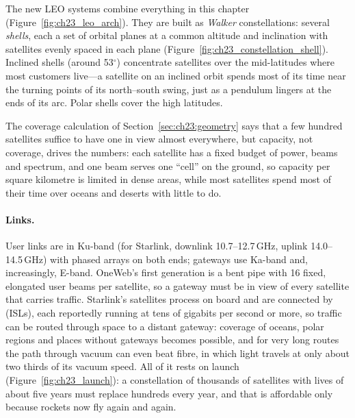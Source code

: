The new LEO systems combine everything in this chapter (Figure~\ref{fig:ch23_leo_arch}). They are
built as \emph{Walker} constellations: several \emph{shells}, each a set of orbital planes at a
common altitude and inclination with satellites evenly spaced in each plane
(Figure~\ref{fig:ch23_constellation_shell}). Inclined shells (around 53$^\circ$) concentrate
satellites over the mid-latitudes where most customers live---a satellite on an inclined orbit
spends most of its time near the turning points of its north--south swing, just as a pendulum
lingers at the ends of its arc. Polar shells cover the high latitudes.


The coverage calculation of Section~\ref{sec:ch23:geometry} says that a few hundred satellites
suffice to have one in view almost everywhere, but capacity, not coverage, drives the numbers: each
satellite has a fixed budget of power, beams and spectrum, and one beam serves one ``cell'' on the
ground, so capacity per square kilometre is limited in dense areas, while most satellites spend
most of their time over oceans and deserts with little to do.


\paragraph{Links.} User links are in Ku-band (for Starlink, downlink 10.7--12.7\,GHz, uplink
14.0--14.5\,GHz) with phased arrays on both ends; gateways use Ka-band and, increasingly, E-band.
OneWeb's first generation is a bent pipe with 16 fixed, elongated user beams per satellite, so a
gateway must be in view of every satellite that carries traffic. Starlink's satellites process on
board and are connected by  (ISLs), each reportedly running at
tens of gigabits per second or more, so traffic can be routed through space to a distant gateway:
coverage of oceans, polar regions and places without gateways becomes possible, and for very long
routes the path through vacuum can even beat fibre, in which light travels at only about two
thirds of its vacuum speed. All of it rests on launch (Figure~\ref{fig:ch23_launch}): a
constellation of thousands of satellites with lives of about five years must replace hundreds
every year, and that is affordable only because rockets now fly again and again.

